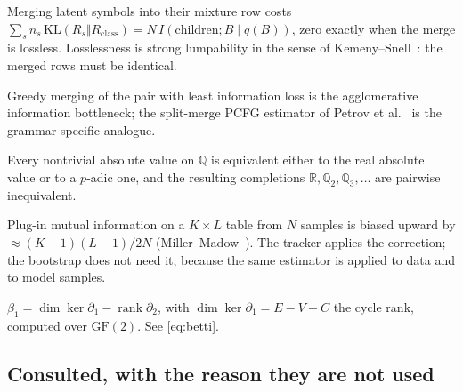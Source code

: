 \begin{construction}
\label{con:merge}
Merging latent symbols into their mixture row costs
$\sum_s n_s\,\mathrm{KL}(R_s\Vert R_{\mathrm{class}}) = N\,I(\text{children};B
\mid q(B))$, zero exactly when the merge is lossless. Losslessness is strong
lumpability in the sense of Kemeny--Snell~\cite{kemeny1960}: the merged rows
must be identical.
\end{construction}

\begin{construction}
\label{con:aib}
Greedy merging of the pair with least information loss is the agglomerative
information bottleneck; the split-merge PCFG estimator of Petrov et
al.~\cite{petrov2006} is the grammar-specific analogue.
\end{construction}

\begin{theorem}
\label{thm:ostrowski}
Every nontrivial absolute value on $\mathbb{Q}$ is equivalent either to the
real absolute value or to a $p$-adic one, and the resulting completions
$\mathbb{R}, \mathbb{Q}_2, \mathbb{Q}_3, \dots$ are pairwise inequivalent.
\end{theorem}

\begin{construction}
\label{con:mm}
Plug-in mutual information on a $K\times L$ table from $N$ samples is biased
upward by $\approx (K-1)(L-1)/2N$ (Miller--Madow~\cite{miller1955}). The
tracker applies the correction; the bootstrap does not need it, because the
same estimator is applied to data and to model samples.
\end{construction}

\begin{construction}
\label{con:betti}
$\beta_1 = \dim\ker\partial_1 - \operatorname{rank}\partial_2$, with
$\dim\ker\partial_1 = E - V + C$ the cycle rank, computed over
$\mathrm{GF}(2)$. See \eqref{eq:betti}.
\end{construction}

\subsection*{Consulted, with the reason they are not used}

